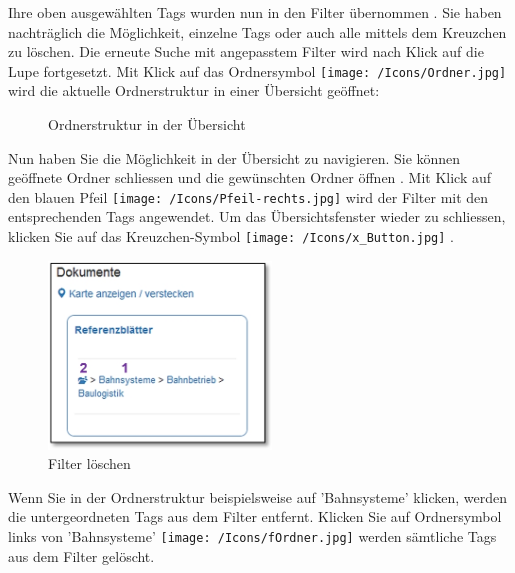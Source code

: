 Ihre oben ausgewählten Tags wurden nun in den Filter übernommen . Sie haben nachträglich die Möglichkeit, einzelne Tags oder auch alle mittels dem Kreuzchen zu löschen. Die erneute Suche mit angepasstem Filter wird nach Klick auf die Lupe  fortgesetzt. Mit Klick auf das Ordnersymbol \texttt{[image: /Icons/Ordner.jpg]}  wird die aktuelle Ordnerstruktur in einer Übersicht geöffnet: 

\begin{figure}[H]
\caption{Ordnerstruktur in der Übersicht}
\end{figure}

Nun haben Sie die Möglichkeit in der Übersicht zu navigieren. Sie können geöffnete Ordner  schliessen und die gewünschten Ordner öffnen . Mit Klick auf den blauen Pfeil \texttt{[image: /Icons/Pfeil-rechts.jpg]}  wird der Filter mit den entsprechenden Tags angewendet. Um das Übersichtsfenster wieder zu schliessen, klicken Sie auf das Kreuzchen-Symbol \texttt{[image: /Icons/x\_Button.jpg]} .


\pagebreak

\begin{figure}   %
  \vspace{-30pt}      %
  \begin{center}
    \includegraphics[height=50mm]{../chapters/11_Dokumentenablage/pictures/11-htag_FilterLoeschen.jpg}
  \end{center}
  \vspace{-20pt}
  \caption{Filter löschen}
  \vspace{-10pt}
\end{figure}
Wenn Sie in der Ordnerstruktur beispielsweise auf 'Bahnsysteme'  klicken, werden die untergeordneten Tags aus dem Filter entfernt. Klicken Sie auf Ordnersymbol links von 'Bahnsysteme' \texttt{[image: /Icons/fOrdner.jpg]}  werden sämtliche Tags aus dem Filter gelöscht.

